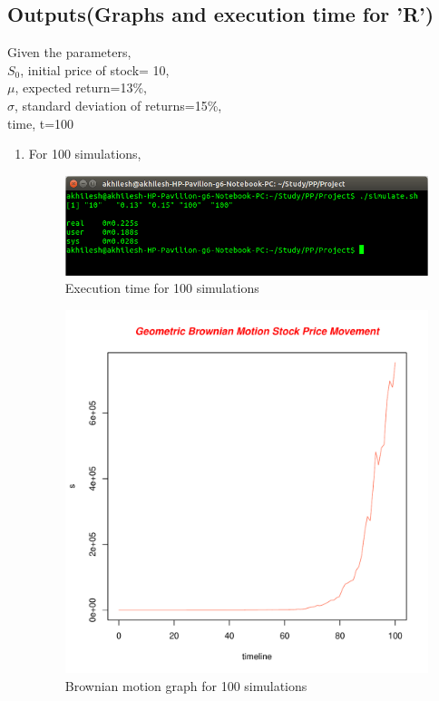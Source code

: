 \documentclass[10pt,a4paper]{article}
\begin{document}
\subsection{Outputs(Graphs and execution time for 'R')}
Given the parameters,\\
$S_{0}$, initial price of stock= 10,\\
$\mu$, expected return=13\%,\\
$\sigma$, standard  deviation of returns=15\%,\\
time, t=100
\begin{enumerate}
\item For 100 simulations,\\
\begin{figure}[h]
\centering
\includegraphics[scale=0.5]{100}
\caption{Execution time for 100 simulations}
\end{figure}
\begin{figure}[h]
\centering
\includegraphics[scale=0.5]{100_graph.pdf}
\caption{Brownian motion graph for 100 simulations}
\end{figure}


\end{enumerate}
\end{document}

